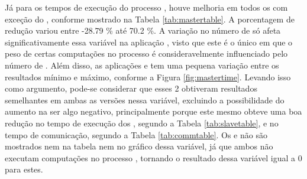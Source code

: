 Já para os tempos de execução do processo \master, houve melhoria em todos os  com exceção do \LU, conforme mostrado na Tabela \ref{tab:mastertable}. A porcentagem de redução variou entre -28.79 \% até 70.2 \%. A variação no número de \clusters só afeta significativamente essa variável na aplicação \KM, visto que este é o único  em que o peso de certas computações no processo \master é consideravelmente influenciado pelo número de \clusters. Além disso, as aplicações \KM e \LU tem uma pequena variação entre os resultados mínimo e máximo, conforme a Figura \ref{fig:mastertime}. Levando isso como argumento, pode-se considerar que esses 2  obtiveram resultados semelhantes em ambas as versões nessa variável, excluindo a possibilidade do aumento na \LU ser algo negativo, principalmente porque este mesmo  obteve uma boa redução no tempo de execução dos \slaves, segundo a Tabela \ref{tab:slavetable}, e no tempo de comunicação, segundo a Tabela \ref{tab:commtable}. Os  \FAST e \GF não são mostrados nem na tabela nem no gráfico dessa variável, já que ambos não executam computações no processo \master, tornando o resultado dessa variável igual a 0 para estes.

\begin{table}[h]
\centering
\caption{Reduções ao comparar-se os tempos do processo \master.}
\label{tab:mastertable}
\end{table}

